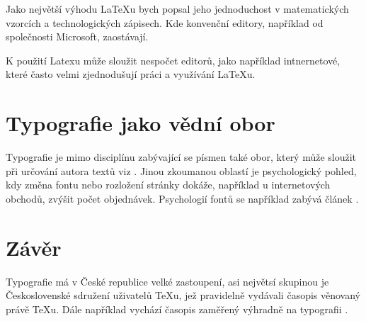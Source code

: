 \documentclass[11pt, a4paper]{article}
\begin{document}
    Jako největší výhodu {\LaTeX}u bych popsal jeho jednoduchost v matematických vzorcích a technologických zápisech. Kde konvenční editory, například od společnosti Microsoft, zaostávají.
    
    K použití Latexu může sloužit nespočet editorů, jako například intnernetové, které často velmi zjednodušují práci a využívání {\LaTeX}u. 
    
\section*{Typografie jako vědní obor}
    Typografie je mimo disciplínu zabývající se písmen také obor, který může sloužit při určování autora textů viz \cite{Beranek2021}. Jinou zkoumanou oblastí je psychologický pohled, kdy změna fontu nebo rozložení stránky dokáže, například u internetových obchodů, zvýšit počet objednávek. Psychologií fontů se například zabývá článek \cite{Grigerova2019}.
    
\section*{Závěr}    
    Typografie má v České republice velké zastoupení, asi největsí skupinou je Československé sdružení uživatelů TeXu, jež pravidelně vydávali časopis věnovaný právě TeXu. Dále například vychází časopis zaměřený výhradně na typografii \cite{FONT}.
    
\newpage
	
	\renewcommand{\refname}{Literatura}
	
\end{document}
